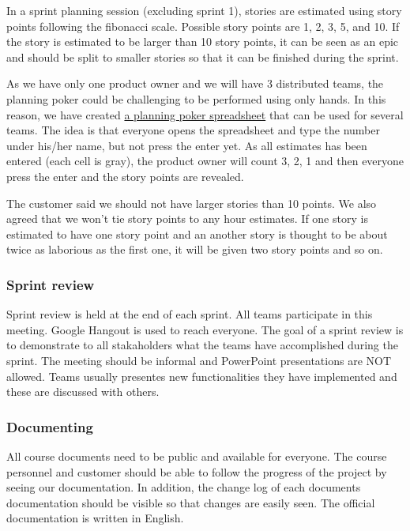 In a sprint planning session (excluding sprint 1), stories are estimated using
story points following the fibonacci scale. Possible story points
are 1, 2, 3, 5, and 10. If the story is estimated to be larger than 10 story
points, it can be seen as an epic and should be split to smaller stories so that
it can be finished during the sprint.

As we have only one product owner and we will have 3 distributed teams, the
planning poker could be challenging to be performed using only hands. In this
reason, we have created
\href{https://docs.google.com/spreadsheet/ccc?key=0Ahu59q_GwtcedFp4dXQzVmFoQWlxandqMkxtdEFiaVE&usp=sharing}{a
planning poker spreadsheet} that can be used for several teams. The idea is that
everyone opens the spreadsheet and type the number under his/her name, but not
press the enter yet. As all estimates has been entered (each cell is gray), the
product owner will count 3, 2, 1 and then everyone press the enter and the story
points are revealed.

The customer said we should not have larger stories than 10 points. We also
agreed that we won't tie story points to any hour estimates. If one story is
estimated to have one story point and an another story is thought to be about
twice as laborious as the first one, it will be given two story points and so
on.

\subsubsection{Sprint review}

Sprint review is held at the end of each sprint. All teams participate in this
meeting. Google Hangout is used to reach everyone. The goal of a sprint review
is to demonstrate to all stakaholders what the teams have accomplished during
the sprint. The meeting should be informal and PowerPoint presentations are
NOT allowed. Teams usually presentes new functionalities they have implemented
and these are discussed with others.

\subsubsection{Documenting}

All course documents need to be public and available for everyone. The course 
personnel and customer should be able to follow the progress of the project by 
seeing our documentation. In addition, the change log of each documents 
documentation should be visible so that changes are easily seen. The official
documentation is written in English.

